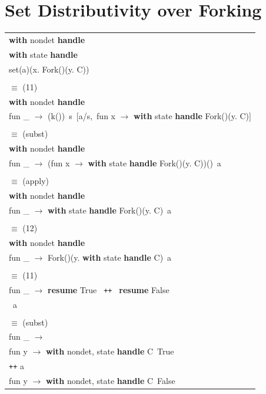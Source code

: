 \documentclass[logo,bsc,singlespacing,parskip]{infthesis}
\begin{document}
\section{Set Distributivity over Forking} \label{set-distributivity-over-forking}
\begin{longtable}{@{}l@{}}
\textbf{with } nondet \textbf{ handle} \\
\quad \textbf{with } state \textbf{ handle} \\
\quad\quad set(a)(x. Fork()(y. C)) \\
\\
\quad$\equiv$ (11) \\
\textbf{with } nondet \textbf{ handle} \\
\quad fun \_ $\rightarrow$ (k())\ s\ [a/s,\ fun x $\rightarrow$ \textbf{with } state \textbf{ handle } Fork()(y. C)] \\
\\
\quad$\equiv$ (subst) \\
\textbf{with } nondet \textbf{ handle} \\
\quad fun \_ $\rightarrow$ (fun x $\rightarrow$ \textbf{with } state \textbf{ handle } Fork()(y. C))()\ a \\
\\
\quad$\equiv$ (apply) \\
\textbf{with } nondet \textbf{ handle} \\
\quad fun \_ $\rightarrow$ \textbf{with } state \textbf{ handle } Fork()(y. C)\ a \\
\\
\quad$\equiv$ (12) \\
\textbf{with } nondet \textbf{ handle} \\
\quad fun \_ $\rightarrow$ Fork()(y. \textbf{with } state \textbf{ handle } C)\ a \\
\\
\quad$\equiv$ (11) \\
fun \_ $\rightarrow$ \textbf{resume } True \texttt{ ++ } \textbf{resume } False \\
\ a \\
\\
\quad$\equiv$ (subst) \\
fun \_ $\rightarrow$ \\
\quad fun y $\rightarrow$ \textbf{with } nondet, state \textbf{ handle } C\ True \\
\quad\quad \texttt{++} \quad \quad \quad \quad \quad \quad \quad \quad \quad \quad \quad \quad \quad \quad \quad \quad \quad a\\
\quad fun y $\rightarrow$ \textbf{with } nondet, state \textbf{ handle } C\ False \\
\end{longtable}
\end{document}
